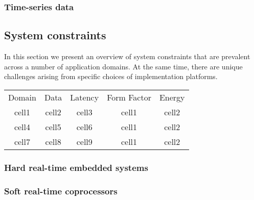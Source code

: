 \subsubsection{Time-series data}

\subsection{System constraints}
In this section we present an overview of system constraints that are prevalent across a number of application domains. At the same time, there are unique challenges arising from specific choices of implementation platforms.


\begin{tabular}{ c c c c c }
 Domain &  Data & Latency & Form Factor &  Energy \\
 cell1  & cell2 & cell3   & cell1       & cell2  \\ 
 cell4 & cell5 & cell6 & cell1 & cell2  \\  
 cell7 & cell8 & cell9 & cell1 & cell2    
\end{tabular}



\subsubsection{Hard real-time embedded systems}
\subsubsection{Soft real-time coprocessors}